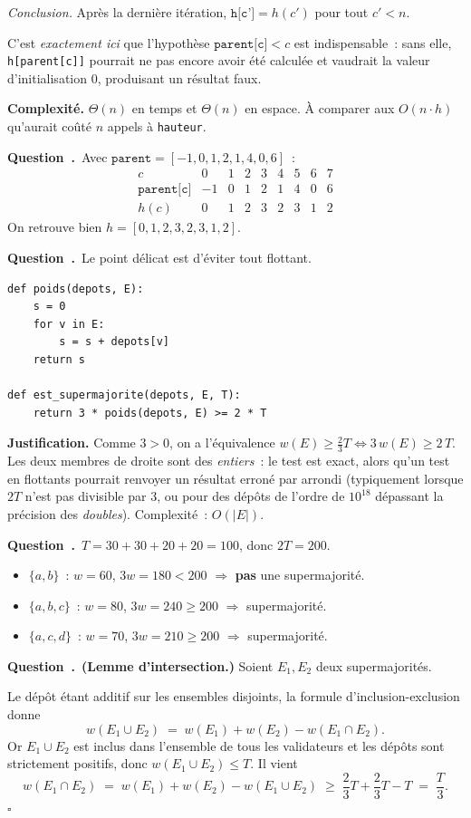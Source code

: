 \documentclass[11pt,a4paper]{article}
\renewcommand{\Q}{\medskip\par\stepcounter{qcnt}\noindent\textbf{\color{cnc}Question~\theqcnt.}~}
\begin{document}
\emph{Conclusion.} Après la dernière itération, $\texttt{h[c']}=h(c')$ pour tout $c'<n$.

C'est \emph{exactement ici} que l'hypothèse $\texttt{parent[c]}<c$ est indispensable~: sans
elle, \texttt{h[parent[c]]} pourrait ne pas encore avoir été calculée et vaudrait la valeur
d'initialisation $0$, produisant un résultat faux.

\textbf{Complexité.} $\Theta(n)$ en temps et $\Theta(n)$ en espace. À comparer aux
$O(n\cdot h)$ qu'aurait coûté $n$ appels à \texttt{hauteur}.

\Q Avec $\texttt{parent} = [-1,0,1,2,1,4,0,6]$~:
\[
\begin{array}{c|cccccccc}
c & 0&1&2&3&4&5&6&7\\\hline
\texttt{parent[c]} & -1&0&1&2&1&4&0&6\\
h(c) & 0&1&2&3&2&3&1&2
\end{array}
\]
On retrouve bien $h=[0,1,2,3,2,3,1,2]$.

\Q Le point délicat est d'éviter tout flottant.
\begin{lstlisting}
def poids(depots, E):
    s = 0
    for v in E:
        s = s + depots[v]
    return s

def est_supermajorite(depots, E, T):
    return 3 * poids(depots, E) >= 2 * T
\end{lstlisting}
\textbf{Justification.} Comme $3>0$, on a l'équivalence
$w(E)\ge \tfrac{2}{3}T \iff 3\,w(E)\ge 2\,T$. Les deux membres de droite sont des
\emph{entiers}~: le test est exact, alors qu'un test  en flottants pourrait
renvoyer un résultat erroné par arrondi (typiquement lorsque $2T$ n'est pas divisible par
$3$, ou pour des dépôts de l'ordre de $10^{18}$ dépassant la précision des \emph{doubles}).
Complexité~: $O(|E|)$.

\Q $T = 30+30+20+20 = 100$, donc $2T = 200$.
\begin{itemize}[leftmargin=1.4em,itemsep=1pt]
\item $\{a,b\}$~: $w=60$, $3w=180<200$ $\Rightarrow$ \textbf{pas} une supermajorité.
\item $\{a,b,c\}$~: $w=80$, $3w=240\ge 200$ $\Rightarrow$ supermajorité.
\item $\{a,c,d\}$~: $w=70$, $3w=210\ge 200$ $\Rightarrow$ supermajorité.
\end{itemize}

\Q \textbf{(Lemme d'intersection.)} Soient $E_1,E_2$ deux supermajorités.

Le dépôt étant additif sur les ensembles disjoints, la formule d'inclusion-exclusion donne
\[ w(E_1\cup E_2)\;=\;w(E_1)+w(E_2)-w(E_1\cap E_2). \]
Or $E_1\cup E_2$ est inclus dans l'ensemble de tous les validateurs et les dépôts sont
strictement positifs, donc $w(E_1\cup E_2)\le T$. Il vient
\[ w(E_1\cap E_2)\;=\;w(E_1)+w(E_2)-w(E_1\cup E_2)\;\ge\;\frac{2}{3}T+\frac{2}{3}T-T
\;=\;\frac{T}{3}. \]
\hfill$\square$
\end{document}
